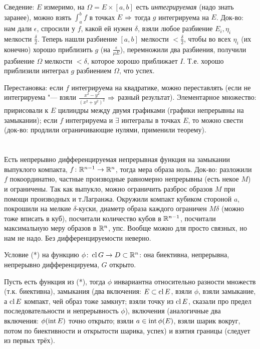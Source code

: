 \section{} %
Сведение: $E$ измеримо, на $\Omega=E\times[a,b]$ есть \textit{интегрируемая} (надо знать заранее), можно взять $\int_a^b f$ в точках $E$ $\Rightarrow$ тогда $g$ интегрируема на $E$.
Док-во: нам дали $\epsilon$, спросили у $f$, какой ей нужен $\delta$, взяли любое разбиение $E_i, \eta_i$ мелкости $\frac \delta 2$.
Теперь нашли разбиение $[a,b]$ мелкости $<\frac\delta 2$, чтобы во всех $\eta_i$ (их конечно) хорошо приблизить $g$ (на $\frac{\epsilon}{\mu E}$), перемножили
два разбиения, получили разбиение $\Omega$ мелкости $<\delta$, которое хорошо приближает $I$.
Т.е. хорошо приблизили интеграл $g$ разбиением $\Omega$, что успех.

Перестановка: если $f$ интегрируема на квадратике, можно переставлять (если не интегрируема "--- взяли $\frac{x^2-y^2}{(x^2+y^2)^2}$ $\Rightarrow$ разный результат).
Элементарное множество: пририсовали к $E$ цилиндры между двумя графиками (графики непрерывны на замыкании);
если $f$ интегрируема и $\exists$ интегралы в точках $E$, то можно свести (док-во: продлили ограничивающие нулями, применили теорему).

\section{} %
Есть непрерывно дифференцируемая непрерывная функция на замыкании выпуклого компакта, $f \colon \mathbb{R}^{n-1} \to \mathbb{R}^n$, тогда мера образа ноль.
Док-во: разложили $f$ покоординатно, частные производные равномерно непрерывны (есть некое $M$) и ограничены.
Так как выпукло, можно ограничить разброс образов $M$ при помощи производных и т.Лагранжа.
Окружили компакт кубиком стороной $a$, покрошили на мелкие $\delta$-куски, диаметр образа каждого ограничен $M \delta$ (можно тоже вписать в куб), посчитали количество кубов в $\mathbb{R}^{n-1}$,
посчитали максимальную меру образов в $\mathbb{R}^n$, упс.
Вообще можно для просто связных, но нам не надо.
Без дифференцируемости неверно.

Условие (*) на функцию $\phi \colon \operatorname{cl} G \to D \subset \mathbb{R}^n$: она биективна, непрерывна, непрерывно дифференцируема, $G$ открыто.

Пусть есть функция из (*), тогда $\phi$ инвариантна относительно
разности множеств (т.к. биективна),
замыкания (два включения: $E \subset \operatorname{cl} E$, взяли $\phi$, взяли замыкание, а $\operatorname{cl} E$ компакт, чей образ тоже замкнут; взяли точку из $\operatorname{cl} E$, сказали про предел последовательности и непрерывность $\phi$),
включения (аналогичные два включения: $\phi(\operatorname{int} E)$ точно открыто; взяли $a \in \operatorname{int} \phi(E)$, взяли шарик вокруг, потом по биективности и открытости шарика, успех)
и взятия границы (следует из первых трёх).

